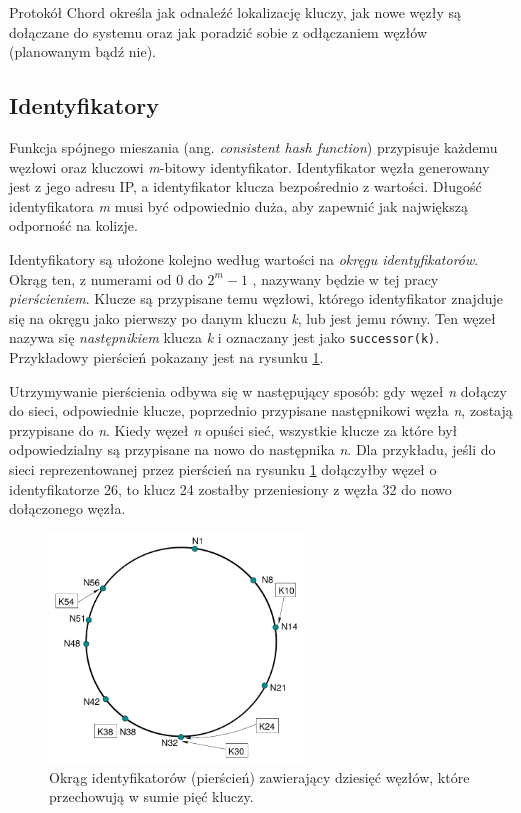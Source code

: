 \documentclass[12pt, twoside, openany]{report}
\begin{document}
Protokół Chord określa jak odnaleźć lokalizację kluczy, jak nowe węzły są dołączane do systemu oraz jak poradzić sobie z odłączaniem węzłów (planowanym bądź nie).

\subsection{Identyfikatory}
\label{ch_ch_id}

Funkcja spójnego mieszania (ang. \textit{consistent hash function}) przypisuje każdemu węzłowi oraz kluczowi \textit{m}-bitowy identyfikator. Identyfikator węzła generowany jest z jego adresu IP, a identyfikator klucza bezpośrednio z wartości. Długość identyfikatora \textit{m} musi być odpowiednio duża, aby zapewnić jak największą odporność na kolizje.

Identyfikatory są ułożone kolejno według wartości na \textit{okręgu identyfikatorów}. Okrąg ten, z numerami od $0$ do  $2^m-1$ , nazywany będzie w tej pracy \textit{pierścieniem}. Klucze są przypisane temu węzłowi, którego identyfikator znajduje się na okręgu jako pierwszy po danym kluczu \textit{k}, lub jest jemu równy. Ten węzeł nazywa się \textit{następnikiem} klucza \textit{k} i oznaczany jest jako \texttt{successor(k)}. Przykładowy pierścień pokazany jest na rysunku \ref{fig:pierscien}.

Utrzymywanie pierścienia odbywa się w następujący sposób: gdy węzeł \textit{n} dołączy do sieci, odpowiednie klucze, poprzednio przypisane następnikowi węzła \textit{n}, zostają przypisane do \textit{n}. Kiedy węzeł \textit{n} opuści sieć, wszystkie klucze za które był odpowiedzialny są przypisane na nowo do następnika \textit{n}. Dla przykładu, jeśli do sieci reprezentowanej przez pierścień na rysunku \ref{fig:pierscien} dołączyłby węzeł o identyfikatorze 26, to klucz 24 zostałby przeniesiony z węzła 32 do nowo dołączonego węzła.

\begin{figure}[H]
\centering
\includegraphics[width=0.6\textwidth,height=\textheight,keepaspectratio]{ring.png}
\caption{Okrąg identyfikatorów (pierścień) zawierający dziesięć węzłów, które przechowują w sumie pięć kluczy.}
\label{fig:pierscien}
\end{figure}
\end{document}

